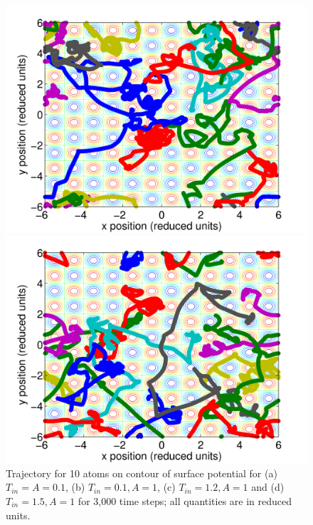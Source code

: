 \documentclass[12pt, oneside]{article}
\begin{document}
\begin{figure}
\begin{minipage}[!htbp]{.5\linewidth}
\end{minipage}
\hspace{0.02\linewidth}
\begin{minipage}[!htbp]{.5\linewidth}
\includegraphics[width=\textwidth]{./figs/ex2-10n-acon1-tin1p2.png}
\subcaption{}
\end{minipage}
\begin{minipage}[!htbp]{.5\linewidth}
\includegraphics[width=\textwidth]{./figs/ex2-10n-acon1-tin1p5.png}
\subcaption{}
\end{minipage}
\caption{Trajectory for 10 atoms on contour of surface potential for (a) $T_{in} = A = 0.1$, (b) $T_{in} = 0.1, A = 1$, (c) $T_{in} = 1.2, A = 1$ and (d) $T_{in} = 1.5, A = 1$ for 3,000 time steps; all quantities are in reduced units.}
\label{fig:trajmult}
\end{figure}
\end{document}
